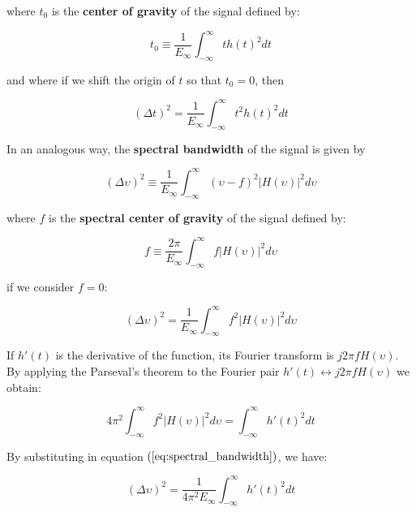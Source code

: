 where $t_0$ is the \textbf{center of gravity} of the signal defined by:

\begin{equation}\label{eq:center_of_gravity}
    t_0 \equiv \frac{1}{E_{\infty}} \int_{-\infty}^{\infty} t h(t)^2 dt
\end{equation}

and where if we shift the origin of $t$ so that $t_{0}=0$, then

\begin{equation}\label{eq:time_dispersion}
    (\Delta t)^2 = \frac{1}{E_{\infty}} \int_{-\infty}^{\infty} t^2 h(t)^2 dt
\end{equation}

In an analogous way, the \textbf{spectral bandwidth} of the signal is given by

\begin{equation}\label{eq:spectral_bandwidth_no_centered}
    (\Delta \upsilon)^2 \equiv \frac{1}{E_{\infty}} \int_{-\infty}^{\infty} (\upsilon-f)^2 |H(\upsilon)|^2 d\upsilon
\end{equation}

where $f$ is the \textbf{spectral center of gravity} of the signal defined by:

\begin{equation}\label{eq:spectral_center_of_gravity}
    f \equiv  \frac{2 \pi}{E_{\infty}} \int_{-\infty}^{\infty} f |H(\upsilon)|^2 d\upsilon
\end{equation}

if we consider $f=0$:

\begin{equation}\label{eq:spectral_bandwidth}
    (\Delta \upsilon)^2 = \frac{1}{E_{\infty}} \int_{-\infty}^{\infty} f^2 |H(\upsilon)|^2 d\upsilon 
\end{equation}

If $h'(t)$ is the derivative of the function, its Fourier transform is $j2\pi f H(\upsilon)$. By applying the Parseval's theorem to the Fourier pair $h'(t)\longleftrightarrow j2\pi f H(\upsilon)$ we obtain:

\begin{equation}\label{eq:applyed_parseval_theorem}
    4 \pi^{2} \int_{-\infty}^{\infty} f^2 |H(\upsilon)|^2 d\upsilon =  \int_{-\infty}^{\infty} h'(t)^2 dt
\end{equation}

By substituting in equation $(\eqref{eq:spectral_bandwidth})$, we have:

\begin{equation}\label{eq:spectral_bandwidth2}
    (\Delta \upsilon)^2 = \frac{1}{4 \pi^{2} E_{\infty}} \int_{-\infty}^{\infty} h'(t)^2 dt
\end{equation}

